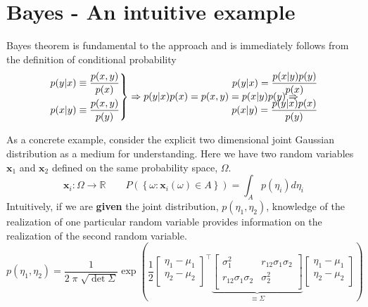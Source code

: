 \documentclass{article}         %
\theoremstyle{definition}
\theoremstyle{remark}
\begin{document}
\nocite{*}



\appendix
\section{Bayes - An intuitive example}
Bayes theorem is fundamental to the approach and is immediately
follows from the definition of conditional probability
\[
\left.
\begin{split}
p(y|x)  \equiv  \frac{p(x,y)}{p(x)}  \\
p(x|y)  \equiv  \frac{p(x,y)}{p(y)} 
\end{split}
\right\}
\Rightarrow
p(y|x) p(x) = p(x,y) = p(x|y) p(y)
\Rightarrow
\hspace{-1in}
\begin{split}
p(y|x)  =\frac{ p(x|y) p(y) }{p(x) } \\
p(x|y)  =\frac{ p(y|x) p(x) }{p(y) } \\
\end{split}
\]

As a concrete example, consider the explicit two dimensional joint Gaussian
distribution as a medium for understanding. Here we have two random
variables $\mathbf{x}_1$ and $\mathbf{x}_2$ defined on the same probability
space, $\Omega$.
\[
\mathbf{x}_i: \Omega \rightarrow \mathbb{R}
\qquad
P\left( \left\{ \omega: 
\mathbf{x}_i (\omega) \in A
 \right\}\right)
=
\int_A p(\eta_i) d\eta_i
\]
Intuitively, if we are \textbf{given} the joint distribution,
$p(\eta_1,\eta_2)$, knowledge of the realization of one particular random
variable provides information on the realization of the second random
variable.
\[
      p(\eta_1,\eta_2)  = \frac{1}{2 \; \pi \; \sqrt{\det{\Sigma}}}
\exp\left( \frac{1}{2}
\begin{bmatrix}
\eta_1 - \mu_1 \\
\eta_2 - \mu_2 \\
\end{bmatrix}^\top
\underbrace{
\begin{bmatrix}
       \sigma_1^2        & r_{12} \sigma_1 \sigma_2 \\
r_{12} \sigma_1 \sigma_2 &          \sigma_2^2 \\
\end{bmatrix}
}_{\equiv \Sigma}
\begin{bmatrix}
\eta_1 - \mu_1 \\
\eta_2 - \mu_2 \\
\end{bmatrix}
\right)
\]
\end{document}
